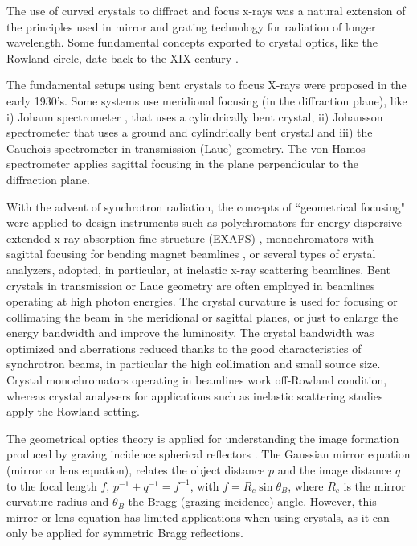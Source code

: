 \documentclass[preprint]{iucr}              %
\begin{document}
The use of curved crystals to diffract and focus x-rays was a natural extension of the principles used in mirror and grating technology for radiation of longer wavelength. Some fundamental concepts exported to crystal optics, like the Rowland circle, date back to the XIX century \cite{rowland1882}.

The fundamental setups using bent crystals to focus X-rays were proposed in the early 1930’s. Some systems use meridional focusing (in the diffraction plane), like i) Johann spectrometer \cite{Johann1931}, that uses a cylindrically bent crystal,  ii) Johansson spectrometer \cite{Johansson1933} that uses a ground and cylindrically bent crystal and iii) the Cauchois spectrometer \cite{cauchois1933} in transmission (Laue) geometry. The von Hamos spectrometer \cite{V.Hamos1933} applies sagittal focusing in the plane perpendicular to the diffraction plane.

With the advent of synchrotron radiation, the concepts of ``geometrical focusing" were applied to design instruments such as polychromators for energy-dispersive extended x-ray absorption fine structure (EXAFS) \cite{Tolentino:ms0206}, monochromators with sagittal focusing for bending magnet beamlines \cite{Sparks1980}, or several types of crystal analyzers, adopted, in particular, at inelastic x-ray scattering beamlines. Bent crystals in transmission or Laue geometry are often employed in beamlines operating at high photon energies. The crystal curvature is used for focusing or collimating the beam in the meridional \cite{Suortti1988,SuorttiShulze} or sagittal \cite{Zhong2001} planes, or just to enlarge the energy bandwidth and improve the luminosity. The crystal bandwidth was optimized and aberrations reduced thanks to the good characteristics of synchrotron beams, in particular the high collimation and small source size. Crystal monochromators operating in beamlines work off-Rowland condition, whereas crystal analysers for applications such as inelastic scattering studies apply the Rowland setting.

The geometrical optics theory is applied for understanding the image formation produced by grazing incidence spherical reflectors \cite{KB1948}. The Gaussian mirror equation (mirror or lens equation), relates the object distance $p$ and the image distance $q$ to the focal length $f$, $p^{-1}+q^{-1}=f^{-1}$, with $f=R_c \sin\theta_B$, where $R_c$ is the mirror curvature radius and $\theta_B$ the Bragg (grazing incidence) angle. However, this mirror or lens equation has limited applications when using crystals, as it can only be applied for symmetric Bragg reflections.
\end{document}
